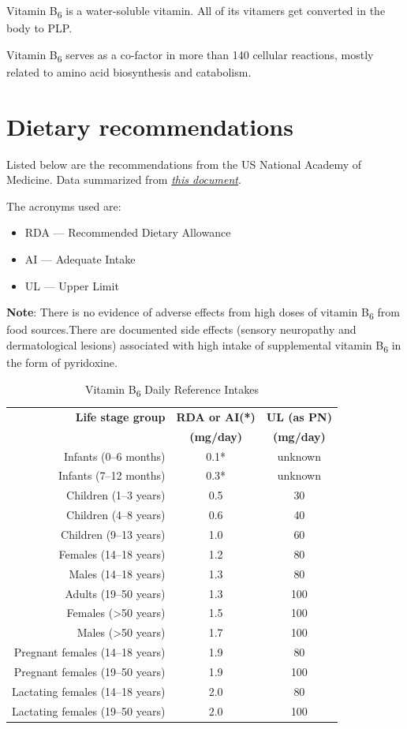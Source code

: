 \documentclass{book}
\begin{document}
 Vitamin B\textsubscript{6} is a water-soluble vitamin. All of its vitamers get converted in the body to PLP.

 Vitamin B\textsubscript{6} serves as a co-factor in more than 140 cellular reactions, mostly related to amino acid biosynthesis and catabolism.

\section{Dietary recommendations}
Listed below are the recommendations from the US National Academy of Medicine. Data summarized from \href{https://nap.nationalacademies.org/read/6015/chapter/9}{\textit{this document}}.

The acronyms used are:
\begin{itemize}
	\item RDA --- Recommended Dietary Allowance
	\item AI --- Adequate Intake
	\item UL --- Upper Limit
\end{itemize}

\textbf{Note}: There is no evidence of adverse effects from high doses of vitamin B\textsubscript{6} from food sources.There are documented side effects (sensory neuropathy and dermatological lesions) associated with high intake of supplemental vitamin B\textsubscript{6} in the form of pyridoxine.

\begin{table}[h]
	\caption{Vitamin B\textsubscript{6} Daily Reference Intakes}
	\centering \begin{tabular}{| r | c | c |}
		\hline
		\textbf{Life stage group} & \textbf{RDA or AI(*)} & \textbf{UL (as PN)}\\
		& \textbf{(mg/day)} & \textbf{(mg/day)}\\ \hline
		Infants (0--6 months) & 0.1* & unknown\\ \hline
		Infants (7--12 months) & 0.3* & unknown\\ \hline
		Children (1--3 years) & 0.5 & 30\\ \hline
		Children (4--8 years) & 0.6 & 40\\ \hline
		Children (9--13 years) & 1.0 & 60\\ \hline
		Females (14--18 years) & 1.2 & 80\\ \hline
		Males (14--18 years) & 1.3 & 80\\ \hline
		Adults (19--50 years) & 1.3 & 100\\ \hline
		Females (\textgreater50 years) & 1.5 & 100\\ \hline
		Males (\textgreater50 years) & 1.7 & 100\\ \hline
		Pregnant females (14--18 years) & 1.9 & 80\\ \hline
		Pregnant females (19--50 years) & 1.9 & 100\\ \hline
		Lactating females (14--18 years) & 2.0 & 80\\ \hline
		Lactating females (19--50 years) & 2.0 & 100\\ \hline
	\end{tabular}
\end{table}
\newpage
\end{document}
